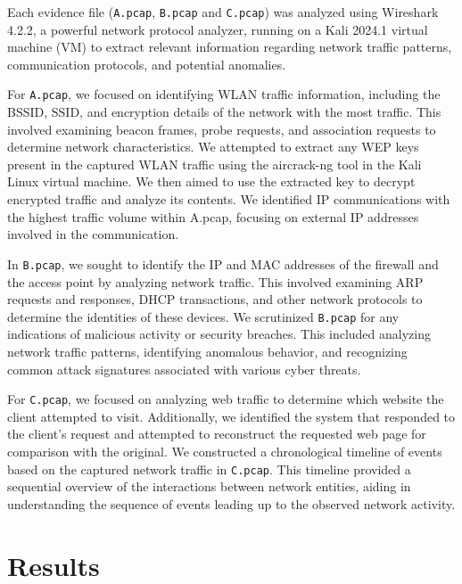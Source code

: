 \noindent Each evidence file (\texttt{A.pcap}, \texttt{B.pcap} and \texttt{C.pcap}) was analyzed using Wireshark 4.2.2, a powerful network protocol analyzer, running on a Kali 2024.1 virtual machine (VM) to extract relevant information regarding network traffic patterns, communication protocols, and potential anomalies. 
\newline

\noindent For \texttt{A.pcap}, we focused on identifying WLAN traffic information, including the BSSID, SSID, and encryption details of the network with the most traffic. This involved examining beacon frames, probe requests, and association requests to determine network characteristics. We attempted to extract any WEP keys present in the captured WLAN traffic using the aircrack-ng tool in the Kali Linux virtual machine. We then aimed to use the extracted key to decrypt encrypted traffic and analyze its contents. We identified IP communications with the highest traffic volume within A.pcap, focusing on external IP addresses involved in the communication.
\newline

\noindent In \texttt{B.pcap}, we sought to identify the IP and MAC addresses of the firewall and the access point by analyzing network traffic. This involved examining ARP requests and responses, DHCP transactions, and other network protocols to determine the identities of these devices. We scrutinized \texttt{B.pcap} for any indications of malicious activity or security breaches. This included analyzing network traffic patterns, identifying anomalous behavior, and recognizing common attack signatures associated with various cyber threats.
\newline

\noindent For \texttt{C.pcap}, we focused on analyzing web traffic to determine which website the client attempted to visit. Additionally, we identified the system that responded to the client's request and attempted to reconstruct the requested web page for comparison with the original. We constructed a chronological timeline of events based on the captured network traffic in \texttt{C.pcap}. This timeline provided a sequential overview of the interactions between network entities, aiding in understanding the sequence of events leading up to the observed network activity.


\section{Results}
